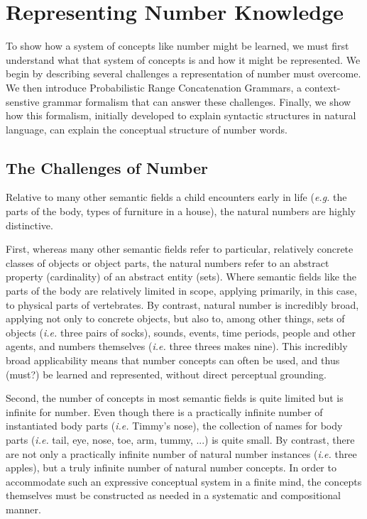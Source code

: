 \documentclass[10pt,letterpaper]{article}
\begin{document}
\section{Representing Number Knowledge}

To show how a system of concepts like number might be learned, we must
first understand what that system of concepts is and how it might be
represented. We begin by describing several challenges a
representation of number must overcome. We then introduce
Probabilistic Range Concatenation Grammars, a context-senstive grammar
formalism that can answer these challenges. Finally, we show how this
formalism, initially developed to explain syntactic structures in
natural language, can explain the conceptual structure of number
words.

\subsection{The Challenges of Number}

Relative to many other semantic fields a child encounters early in
life ({\it e.g.} the parts of the body, types of furniture in a
house), the natural numbers are highly distinctive.

First, whereas many other semantic fields refer to particular,
relatively concrete classes of objects or object parts, the natural
numbers refer to an abstract property (cardinality) of an abstract
entity (sets). Where semantic fields like the parts of the body are
relatively limited in scope, applying primarily, in this case, to
physical parts of vertebrates. By contrast, natural number is
incredibly broad, applying not only to concrete objects, but also to,
among other things, sets of objects ({\it i.e.}  three pairs of
socks), sounds, events, time periods, people and other agents, and
numbers themselves ({\it i.e.}  three threes makes nine). This
incredibly broad applicability means that number concepts can often be
used, and thus (must?) be learned and represented, without direct
perceptual grounding.

Second, the number of concepts in most semantic fields is quite
limited but is infinite for number. Even though there is a practically
infinite number of instantiated body parts ({\it i.e.} Timmy's nose),
the collection of names for body parts ({\it i.e.} tail, eye, nose,
toe, arm, tummy, ...) is quite small. By contrast, there are not only
a practically infinite number of natural number instances ({\it i.e.}
three apples), but a truly infinite number of natural number
concepts. In order to accommodate such an expressive conceptual system
in a finite mind, the concepts themselves must be constructed as
needed in a systematic and compositional manner.
\end{document}
